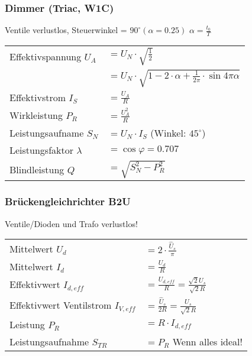 \begin{multicols}{2}
\subsubsection{Dimmer (Triac, W1C)}
Ventile verlustlos, Steuerwinkel = $90^\circ  (\alpha = 0.25)$ \newline
{} $\alpha = \frac{t_0}{T}$

\renewcommand{\arraystretch}{1.5}
 \begin{tabular}{ll}
 	Effektivspannung $U_A$		& $ = U_N \cdot \sqrt{\frac{1}{2}}$ \\
 								& $ = U_N \cdot \sqrt{1-2 \cdot \alpha +
 	\frac{1}{2\pi} \cdot \sin{4 \pi \alpha}}$\\
 	Effektivstrom $I_S$			& $ = \frac{U_A}{R}$ \\
 	Wirkleistung $P_R$			& $ = \frac{U_A^2}{R} $ \\
 	Leistungsaufname $S_N$		& $ = U_N \cdot I_S $ (Winkel: $45^\circ$) \\
 	Leistungsfaktor $\lambda$	& $ = \cos \varphi = 0.707 $\\
 	Blindleistung $Q$			& $ = \sqrt{S_N^2 -P_R^2}$\\
 \end{tabular}
 \end{multicols}
 
 \begin{multicols}{2} 
 \subsubsection{Brückengleichrichter B2U}
 Ventile/Dioden und Trafo verlustlos! \newline
 
 \renewcommand{\arraystretch}{1.5}
 \begin{tabular}{ll}
 	Mittelwert $U_d$						& $ = 2 \cdot \frac{\hat{U}_s}{\pi}$ \\
 	Mittelwert $I_d$						& $ = \frac{U_d}{R}$ \\
 	Effektivwert $I_{d,eff}$				& $ = \frac{U_{d,eff}}{R} = \frac{\sqrt{2} U_s}{\sqrt{2} R}$ \\
 	Effektivwert Ventilstrom $I_{V,eff}$	& $ = \frac{\hat{U}_s}{2 R} = \frac{U_s}{\sqrt{2} R}$ \\
 	Leistung $P_R$							& $ = R \cdot I_{d,eff}$ \\
 	Leistungsaufnahme $S_{TR}$				& $ = P_R $ Wenn alles ideal!
 \end{tabular} 
 \end{multicols}
